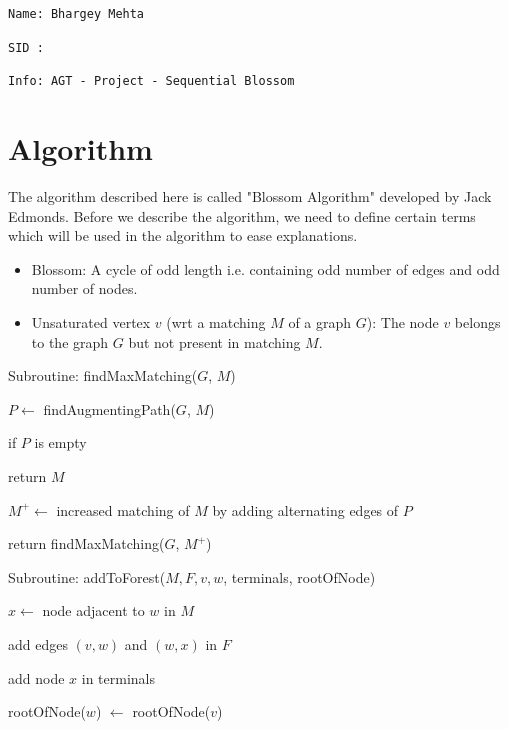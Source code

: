 \documentclass{article}
\begin{document}
\Large{\texttt{Name: Bhargey Mehta}}

\Large{\texttt{SID : }}

\Large{\texttt{Info: AGT - Project - Sequential Blossom}}

\section{Algorithm}
The algorithm described here is called "Blossom Algorithm" developed by Jack Edmonds. Before we describe the algorithm, we need to define certain terms which will be used in the algorithm to ease explanations.

\begin{itemize}
    \item Blossom: A cycle of odd length i.e. containing odd number of edges and odd number of nodes.
    \item Unsaturated vertex $v$ (wrt a matching $M$ of a graph $G$): The node $v$ belongs to the graph $G$ but not present in matching $M$.
\end{itemize}

Subroutine: findMaxMatching($G$, $M$) \dotfill

\hspace{1cm} $P \leftarrow$ findAugmentingPath($G$, $M$)

\hspace{1cm} if $P$ is empty

\hspace{2cm} return $M$

\hspace{1cm} $M^+ \leftarrow$ increased matching of $M$ by adding alternating edges of $P$

\hspace{1cm} return findMaxMatching($G$, $M^+$)

\vspace{0.5cm}

Subroutine: addToForest($M, F, v, w$, terminals, rootOfNode) \dotfill

\hspace{1cm} $x \leftarrow$ node adjacent to $w$ in $M$

\hspace{1cm} add edges $(v, w)$ and $(w, x)$ in $F$

\hspace{1cm} add node $x$ in terminals

\hspace{1cm} rootOfNode($w$) $\leftarrow$ rootOfNode($v$)
\end{document}
